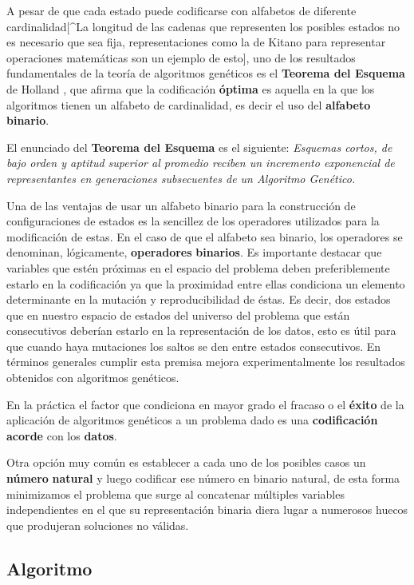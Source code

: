 \documentclass[
  a4paper,
  DIV=11,
  numbers=noendperiod]{scrreprt}
\begin{document}
A pesar de que cada estado puede codificarse con alfabetos de diferente
cardinalidad{[}\^{}La longitud de las cadenas que representen los
posibles estados no es necesario que sea fija, representaciones como la
de Kitano para representar operaciones matemáticas son un ejemplo de
esto{]}, uno de los resultados fundamentales de la teoría de algoritmos
genéticos es el \textbf{Teorema del Esquema} de Holland
\autocite{holland1975}, que afirma que la codificación \textbf{óptima}
es aquella en la que los algoritmos tienen un alfabeto de cardinalidad,
es decir el uso del \textbf{alfabeto} \textbf{binario}.

El enunciado del \textbf{Teorema del Esquema} es el siguiente:
\emph{Esquemas cortos, de bajo orden y aptitud superior al promedio
reciben un incremento exponencial de representantes en generaciones
subsecuentes de un Algoritmo Genético.}

Una de las ventajas de usar un alfabeto binario para la construcción de
configuraciones de estados es la sencillez de los operadores utilizados
para la modificación de estas. En el caso de que el alfabeto sea
binario, los operadores se denominan, lógicamente, \textbf{operadores}
\textbf{binarios}. Es importante destacar que variables que estén
próximas en el espacio del problema deben preferiblemente estarlo en la
codificación ya que la proximidad entre ellas condiciona un elemento
determinante en la mutación y reproducibilidad de éstas. Es decir, dos
estados que en nuestro espacio de estados del universo del problema que
están consecutivos deberían estarlo en la representación de los datos,
esto es útil para que cuando haya mutaciones los saltos se den entre
estados consecutivos. En términos generales cumplir esta premisa mejora
experimentalmente los resultados obtenidos con algoritmos genéticos.

En la práctica el factor que condiciona en mayor grado el fracaso o el
\textbf{éxito} de la aplicación de algoritmos genéticos a un problema
dado es una \textbf{codificación} \textbf{acorde} con los
\textbf{datos}.

Otra opción muy común es establecer a cada uno de los posibles casos un
\textbf{número} \textbf{natural} y luego codificar ese número en binario
natural, de esta forma minimizamos el problema que surge al concatenar
múltiples variables independientes en el que su representación binaria
diera lugar a numerosos huecos que produjeran soluciones no válidas.

\subsection{Algoritmo}\label{algoritmo}
\end{document}
